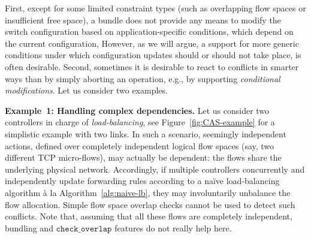 \documentclass[conference]{sigcomm-alternate}
\newcommand{\checko}{\texttt{check\_overlap}\xspace}
\newcommand{\liron}[1]{\textit{\textcolor{mygreen}{[liron]: #1}}} %
\begin{document}
First, %
except for some limited constraint types (such as
overlapping flow spaces or insufficient free space),
a bundle does not provide any means to modify the switch configuration
based on application-specific conditions, which depend on the
current configuration,
However, as we will argue, a support for more generic conditions under which configuration
updates
should or should not take place, is often desirable.
%
%
Second, sometimes it is desirable to react to conflicts in smarter ways than
by simply aborting an operation, e.g., by supporting \emph{conditional modifications}.
Let us consider two examples.

\vspace{1mm}
\noindent \textbf{Example~1: Handling complex dependencies.} Let us consider two controllers
in charge
of \emph{load-balancing}, see Figure~\ref{fig:CAS-example}
for a simplistic example with two links.
In such a scenario, seemingly independent actions, defined over
completely independent logical flow spaces (say, two different
TCP micro-flows),
may actually be dependent: the flows share the underlying physical network.
Accordingly, if multiple controllers concurrently and independently
update forwarding rules according to a na\"ive load-balancing algorithm \`{a} la Algorithm~\ref{alg:naive-lb},
they may involuntarily
unbalance the flow allocation.
Simple flow space overlap checks cannot be used to detect
such conflicts.
Note that, assuming that all these flows are
completely independent, bundling and $\checko$ features do not really
help here.

\end{document}
